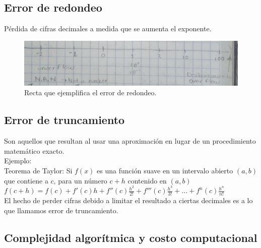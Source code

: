 \subsection{Error de redondeo} 
P\'erdida de cifras decimales a medida que se aumenta el exponente.

\begin{figure}[h]
\includegraphics[scale=.16]{recta-error-redondeo}
\centering
\caption{Recta que ejemplifica el error de redondeo.}
\end{figure}

\subsection{Error de truncamiento}
Son aquellos que resultan al usar una aproximaci\'on en lugar de un procedimiento matem\'atico exacto.\\
Ejemplo:\\
Teorema de Taylor: Si $f(x)$ es una funci\'on suave en un intervalo abierto $(a,b)$ que contiene a $c$, para un n\'umero $c+h$ contenido en $(a,b)$ \\
$f(c+h)=f(c)+f'(c)h+f''(c)\frac{h^2}{2!}+f'''(c)\frac{h^3}{3!}+...+f^n(c)\frac{h^n}{n!}$ \\
El hecho de perder cifras debido a limitar el resultado a ciertas decimales es a lo que llamamos error de truncamiento.\\

\subsection{Complejidad algor\'itmica y costo computacional}

